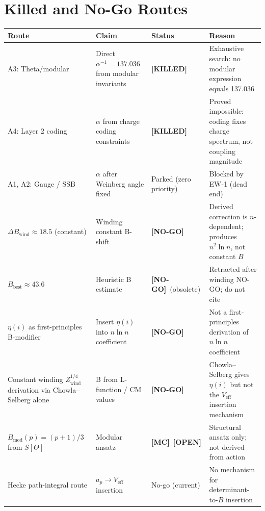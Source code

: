 \documentclass[12pt,a4paper]{article}
\theoremstyle{definition}
\theoremstyle{remark}
\newcommand{\MC}{\textbf{[MC]}}
\newcommand{\OPEN}{\textbf{[OPEN]}}
\newcommand{\NOGO}{\textbf{[NO-GO]}}
\newcommand{\KILLED}{\textbf{[KILLED]}}
\begin{document}
\section{Killed and No-Go Routes}
\label{sec:killed}

\begin{center}
\begin{tabular}{p{2.2cm} p{4.5cm} p{2cm} p{4.5cm}}
\toprule
\textbf{Route} & \textbf{Claim} & \textbf{Status} & \textbf{Reason} \\
\midrule
A3: Theta/modular & Direct $\alpha^{-1}=137.036$ from modular invariants &
  \KILLED &
  Exhaustive search: no modular expression equals 137.036 \\[4pt]
A4: Layer 2 coding & $\alpha$ from charge coding constraints &
  \KILLED &
  Proved impossible: coding fixes charge spectrum, not coupling magnitude \\[4pt]
A1, A2: Gauge / SSB & $\alpha$ after Weinberg angle fixed &
  Parked (zero priority) &
  Blocked by EW-1 (dead end) \\[4pt]
$\Delta B_{\mathrm{wind}} \approx 18.5$ (constant) &
  Winding constant B-shift &
  \NOGO &
  Derived correction is $n$-dependent; produces $n^2\ln n$, not constant $B$ \\[4pt]
$B_{\mathrm{best}} \approx 43.6$ &
  Heuristic B estimate &
  \NOGO\ (obsolete) &
  Retracted after winding NO-GO; do not cite \\[4pt]
$\eta(i)$ as first-principles B-modifier &
  Insert $\eta(i)$ into $n\ln n$ coefficient &
  \NOGO &
  Not a first-principles derivation of $n\ln n$ coefficient \\[4pt]
Constant winding $Z_{\mathrm{wind}}^{1/4}$ derivation via
Chowla--Selberg alone &
  B from L-function / CM values &
  \NOGO &
  Chowla--Selberg gives $\eta(i)$ but not the $V_{\mathrm{eff}}$ insertion mechanism \\[4pt]
$B_{\mathrm{mod}}(p) = (p+1)/3$ from $S[\Theta]$ &
  Modular ansatz &
  \MC\ \OPEN &
  Structural ansatz only; not derived from action \\[4pt]
Hecke path-integral route &
  $a_p \to V_{\mathrm{eff}}$ insertion &
  No-go (current) &
  No mechanism for determinant-to-$B$ insertion \\[4pt]
\bottomrule
\end{tabular}
\end{center}
\end{document}
